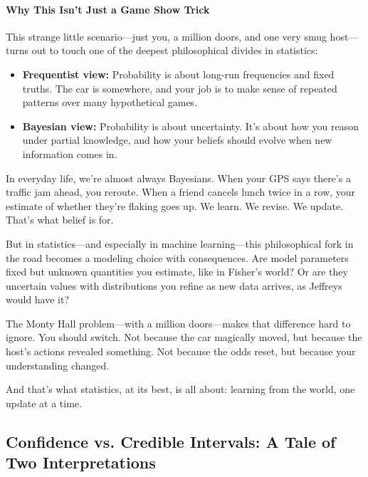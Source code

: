 \paragraph{Why This Isn’t Just a Game Show Trick}

This strange little scenario—just you, a million doors, and one very smug host—turns out to touch one of the deepest philosophical divides in statistics:

\begin{itemize}
    \item \textbf{Frequentist view:} Probability is about long-run frequencies and fixed truths. The car is somewhere, and your job is to make sense of repeated patterns over many hypothetical games.
    \item \textbf{Bayesian view:} Probability is about uncertainty. It’s about how you reason under partial knowledge, and how your beliefs should evolve when new information comes in.
\end{itemize}

In everyday life, we’re almost always Bayesians. When your GPS says there’s a traffic jam ahead, you reroute. When a friend cancels lunch twice in a row, your estimate of whether they’re flaking goes up. We learn. We revise. We update. That’s what belief is for.

But in statistics—and especially in machine learning—this philosophical fork in the road becomes a modeling choice with consequences. Are model parameters fixed but unknown quantities you estimate, like in Fisher’s world? Or are they uncertain values with distributions you refine as new data arrives, as Jeffreys would have it?

The Monty Hall problem—with a million doors—makes that difference hard to ignore. You should switch. Not because the car magically moved, but because the host's actions revealed something. Not because the odds reset, but because your understanding changed.

And that’s what statistics, at its best, is all about: learning from the world, one update at a time.









\subsection{Confidence vs. Credible Intervals: A Tale of Two Interpretations}

